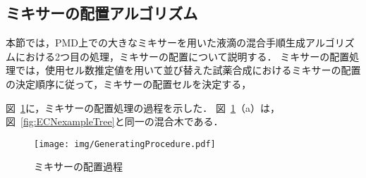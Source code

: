 \subsection{ミキサーの配置アルゴリズム}
本節では，PMD上での大きなミキサーを用いた液滴の混合手順生成アルゴリズムにおける2つ目の処理，ミキサーの配置について説明する．
ミキサーの配置処理では，使用セル数推定値を用いて並び替えた試薬合成におけるミキサーの配置の決定順序に従って，ミキサーの配置セルを決定する，

図~\ref{fig:GeneratingProcedure}に，ミキサーの配置処理の過程を示した．
図~\ref{fig:GeneratingProcedure}（a）は，図~\ref{fig:ECNexampleTree}と同一の混合木である．

\begin{figure}[tbp]
    \centering\texttt{[image: img/GeneratingProcedure.pdf]}
 \caption{ミキサーの配置過程}\label{fig:GeneratingProcedure}
\end{figure}


